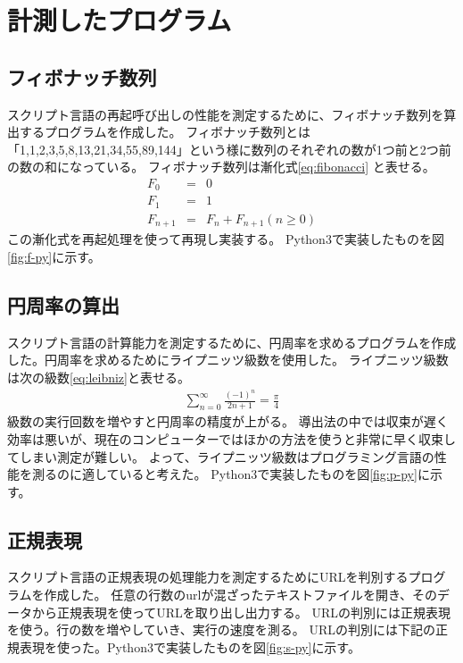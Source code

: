 \chapter{計測したプログラム}
\label{cha:program}

\section{フィボナッチ数列}
スクリプト言語の再起呼び出しの性能を測定するために、フィボナッチ数列を算出するプログラムを作成した。
フィボナッチ数列とは「1,1,2,3,5,8,13,21,34,55,89,144」という様に数列のそれぞれの数が1つ前と2つ前の数の和になっている。
フィボナッチ数列は漸化式\ref{eq:fibonacci} と表せる。
\begin{eqnarray} \label{eq:fibonacci}
  F_{0}&=&0 \nonumber \\
  F_{1}&=&1 \\
  F_{n+1}&=&F_{n}+F_{n+1}(n≥0)\nonumber
\end{eqnarray}
この漸化式を再起処理を使って再現し実装する。
Python3で実装したものを図\ref{fig:f-py}に示す。

\section{円周率の算出}
スクリプト言語の計算能力を測定するために、円周率を求めるプログラムを作成した。円周率を求めるためにライプニッツ級数を使用した。
ライプニッツ級数は次の級数\ref{eq:leibniz}と表せる。
\begin{eqnarray} \label{eq:leibniz}
\sum_{n=0}^{\infty}\frac{(-1)^n}{2n+1}=\frac{\pi}{4}
\end{eqnarray}
級数の実行回数を増やすと円周率の精度が上がる。
導出法の中では収束が遅く効率は悪いが、現在のコンピューターではほかの方法を使うと非常に早く収束してしまい測定が難しい。
よって、ライプニッツ級数はプログラミング言語の性能を測るのに適していると考えた。
Python3で実装したものを図\ref{fig:p-py}に示す。

\section{正規表現}
スクリプト言語の正規表現の処理能力を測定するためにURLを判別するプログラムを作成した。
任意の行数のurlが混ざったテキストファイルを開き、そのデータから正規表現を使ってURLを取り出し出力する。
URLの判別には正規表現を使う。行の数を増やしていき、実行の速度を測る。
URLの判別には下記の正規表現を使った。Python3で実装したものを図\ref{fig:s-py}に示す。

